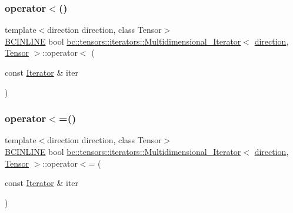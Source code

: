 \subsubsection{\texorpdfstring{operator$<$()}{operator<()}\hspace{0.1cm}{\footnotesize\ttfamily [2/2]}}
{\footnotesize\ttfamily template$<$direction direction, class Tensor$>$ \\
\hyperlink{common_8h_a6699e8b0449da5c0fafb878e59c1d4b1}{B\+C\+I\+N\+L\+I\+NE} bool \hyperlink{structbc_1_1tensors_1_1iterators_1_1Multidimensional__Iterator}{bc\+::tensors\+::iterators\+::\+Multidimensional\+\_\+\+Iterator}$<$ \hyperlink{namespacebc_1_1tensors_1_1iterators_ae76efe63fb9cb4985d5e4e6af0ebf296}{direction}, \hyperlink{namespacebc_a659391e47ab612be3ba6c18cf9c89159}{Tensor} $>$\+::operator$<$ (\begin{DoxyParamCaption}\item[{const \hyperlink{structbc_1_1tensors_1_1iterators_1_1Multidimensional__Iterator_a12d78eb95b3b0fbee7c824f0a79c1513}{Iterator} \&}]{iter }\end{DoxyParamCaption})\hspace{0.3cm}{\ttfamily [inline]}}

\mbox{\label{structbc_1_1tensors_1_1iterators_1_1Multidimensional__Iterator_a24cc26f559cac21831f96621623263f5}} 
\subsubsection{\texorpdfstring{operator$<$=()}{operator<=()}\hspace{0.1cm}{\footnotesize\ttfamily [1/2]}}
{\footnotesize\ttfamily template$<$direction direction, class Tensor$>$ \\
\hyperlink{common_8h_a6699e8b0449da5c0fafb878e59c1d4b1}{B\+C\+I\+N\+L\+I\+NE} bool \hyperlink{structbc_1_1tensors_1_1iterators_1_1Multidimensional__Iterator}{bc\+::tensors\+::iterators\+::\+Multidimensional\+\_\+\+Iterator}$<$ \hyperlink{namespacebc_1_1tensors_1_1iterators_ae76efe63fb9cb4985d5e4e6af0ebf296}{direction}, \hyperlink{namespacebc_a659391e47ab612be3ba6c18cf9c89159}{Tensor} $>$\+::operator$<$= (\begin{DoxyParamCaption}\item[{const \hyperlink{structbc_1_1tensors_1_1iterators_1_1Multidimensional__Iterator_a12d78eb95b3b0fbee7c824f0a79c1513}{Iterator} \&}]{iter }\end{DoxyParamCaption})\hspace{0.3cm}{\ttfamily [inline]}}


